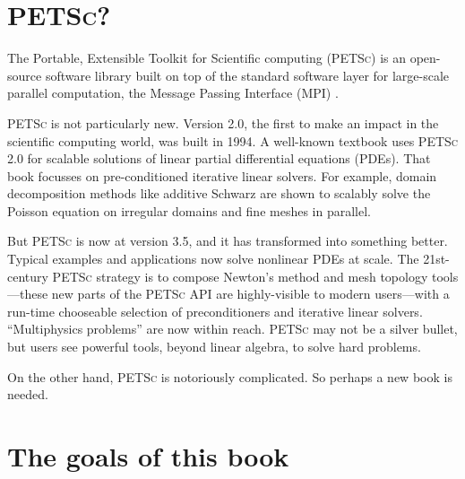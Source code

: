 \documentclass{tufte-book}
\theoremstyle{definition}
\newcommand{\PETSc}{\textsc{PETSc}\xspace}
\begin{document}
\section{\PETSc?}

The Portable, Extensible Toolkit for Scientific computing (\PETSc{}) \citep{petsc-user-ref} is an open-source software library built on top of the standard software layer for large-scale parallel computation, the Message Passing Interface (MPI) \citep{Groppetal1999}.

\PETSc is not particularly new.  Version 2.0, the first to make an impact in the scientific computing world, was built in 1994.  A well-known textbook \citet{Smithetal1996} uses \PETSc 2.0 for scalable solutions of linear partial differential equations (PDEs).  That book focusses on pre-conditioned iterative linear solvers.  For example, domain decomposition methods like additive Schwarz are shown to scalably solve the Poisson equation on irregular domains and fine meshes in parallel.

But \PETSc is now at version 3.5, and it has transformed into something better.  Typical examples and applications now solve nonlinear PDEs at scale.  The 21st-century \PETSc strategy is to compose Newton's method and mesh topology tools---these new parts of the \PETSc API are highly-visible to modern users---with a run-time chooseable selection of preconditioners and iterative linear solvers.  ``Multiphysics problems'' are now within reach.  \PETSc may not be a silver bullet, but users see powerful tools, beyond linear algebra, to solve hard problems.

On the other hand, \PETSc is notoriously complicated.  So perhaps a new book is needed.

\section{The goals of this book}
\end{document}
